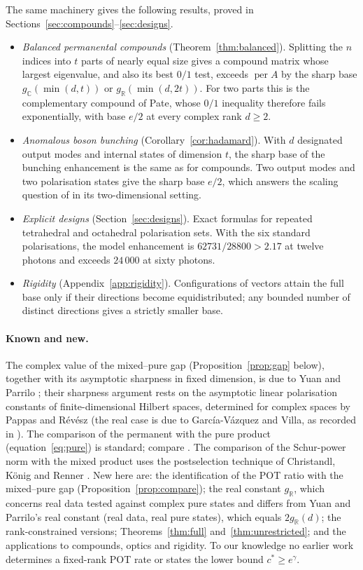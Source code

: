 \documentclass[11pt,a4paper]{article}
\theoremstyle{remark}
\newcommand{\per}{\operatorname{per}}
\newcommand{\C}{\mathbb C}
\newcommand{\R}{\mathbb R}
\begin{document}
The same machinery gives the following results, proved in Sections~\ref{sec:compounds}--\ref{sec:designs}.
\begin{itemize}
\item \emph{Balanced permanental compounds} (Theorem~\ref{thm:balanced}). Splitting the $n$ indices into $t$ parts of nearly equal size gives a compound matrix whose largest eigenvalue, and also its best $0/1$ test, exceeds $\per A$ by the sharp base $g_\C(\min(d,t))$ or $g_\R(\min(d,2t))$. For two parts this is the complementary compound of Pate, whose $0/1$ inequality \cite[Theorem~7]{Pate} therefore fails exponentially, with base $e/2$ at every complex rank $d\ge2$.
\item \emph{Anomalous boson bunching} (Corollary~\ref{cor:hadamard}). With $d$ designated output modes and internal states of dimension $t$, the sharp base of the bunching enhancement is the same as for compounds. Two output modes and two polarisation states give the sharp base $e/2$, which answers the scaling question of \cite{SNC} in its two-dimensional setting.
\item \emph{Explicit designs} (Section~\ref{sec:designs}). Exact formulas for repeated tetrahedral and octahedral polarisation sets. With the six standard polarisations, the model enhancement is $62731/28800>2.17$ at twelve photons and exceeds $24\,000$ at sixty photons.
\item \emph{Rigidity} (Appendix~\ref{app:rigidity}). Configurations of vectors attain the full base only if their directions become equidistributed; any bounded number of distinct directions gives a strictly smaller base.
\end{itemize}

\paragraph{Known and new.}
The complex value of the mixed--pure gap (Proposition~\ref{prop:gap} below), together with its asymptotic sharpness in fixed dimension, is due to Yuan and Parrilo \cite[Theorems~4.6, 5.1 and~5.2]{YP2}; their sharpness argument rests on the asymptotic linear polarisation constants of finite-dimensional Hilbert spaces, determined for complex spaces by Pappas and R\'ev\'esz \cite[Theorem~1]{PR} (the real case is due to Garc\'ia-V\'azquez and Villa, as recorded in \cite[Theorem~F]{PR}). The comparison of the permanent with the pure product (equation~\eqref{eq:pure}) is standard; compare \cite[Corollary~1.2]{YP1}. The comparison of the Schur-power norm with the mixed product uses the postselection technique of Christandl, K\"onig and Renner \cite{CKR}. New here are: the identification of the POT ratio with the mixed--pure gap (Proposition~\ref{prop:compare}); the real constant $g_\R$, which concerns real data tested against complex pure states and differs from Yuan and Parrilo's real constant (real data, real pure states), which equals $2g_\R(d)$; the rank-constrained versions; Theorems~\ref{thm:full} and~\ref{thm:unrestricted}; and the applications to compounds, optics and rigidity. To our knowledge no earlier work determines a fixed-rank POT rate or states the lower bound $c^*\ge e^\gamma$.
\end{document}

